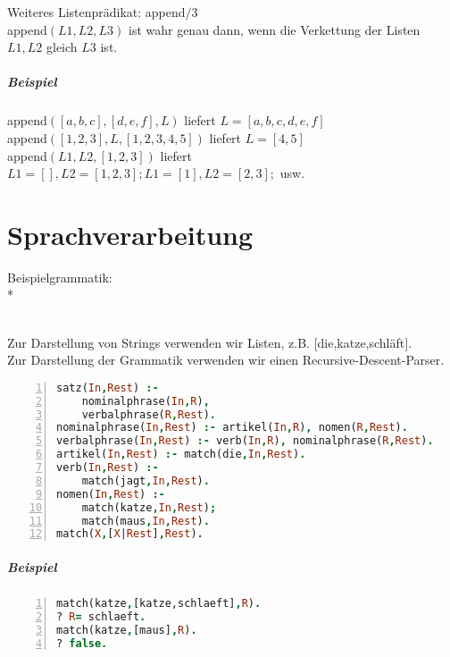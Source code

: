 \documentclass[a4paper]{scrartcl}
\begin{document}
Weiteres Listenprädikat: append$/$3\\
append$(L1,L2,L3)$ ist wahr genau dann, wenn die Verkettung der Listen $L1,L2$ gleich $L3$ ist.
\subparagraph{Beispiel} append$([a,b,c],[d,e,f],L)$ liefert $L=[a,b,c,d,e,f]$\\
append$([1,2,3],L,[1,2,3,4,5])$ liefert $L=[4,5]$\\
append$(L1,L2,[1,2,3])$ liefert $L1 = [], L2=[1,2,3]; L1=[1], L2=[2,3];$ usw.

\section{Sprachverarbeitung}
Beispielgrammatik:\\*
\\
Zur Darstellung von Strings verwenden wir Listen, z.B. $[$die,katze,schläft$]$.\\
Zur Darstellung der Grammatik verwenden wir einen Recursive-Descent-Parser.\\
\begin{lstlisting}[numbers=left, tabsize=4, language=Prolog]
satz(In,Rest) :-
    nominalphrase(In,R),
    verbalphrase(R,Rest).
nominalphrase(In,Rest) :- artikel(In,R), nomen(R,Rest).
verbalphrase(In,Rest) :- verb(In,R), nominalphrase(R,Rest).
artikel(In,Rest) :- match(die,In,Rest).
verb(In,Rest) :-
    match(jagt,In,Rest).
nomen(In,Rest) :-
    match(katze,In,Rest);
    match(maus,In,Rest).
match(X,[X|Rest],Rest).
\end{lstlisting}
\subparagraph{Beispiel}
\begin{lstlisting}[numbers=left, tabsize=4, language=Prolog]
match(katze,[katze,schlaeft],R).
? R= schlaeft.
match(katze,[maus],R).
? false.
\end{lstlisting}
\end{document}

